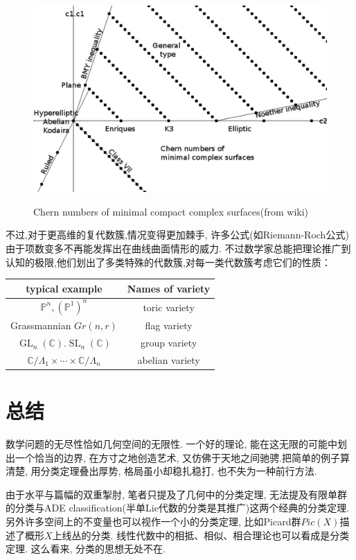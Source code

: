 \documentclass[UTF8,12pt,twoside]{article}
\theoremstyle{definition}
\newcommand{\CC}{\mathbb{C}}  %
\newcommand{\GL}{\operatorname{GL}}
\newcommand{\SL}{\operatorname{SL}}
\numberwithin{equation}{section}
\begin{document}
\begin{center}
	\begin{figure}[ht]
		\vspace{0cm}
		\centering
		\includegraphics[width=14cm]{9-7-fig/chernofsurfaces.png}
		\label{fig:chernnumber}
		\captionsetup{labelformat=empty}
		\caption{Chern numbers of minimal compact complex surfaces(from wiki)}
	\end{figure}
\end{center}

不过,对于更高维的复代数簇,情况变得更加棘手, 许多公式(如Riemann-Roch公式)由于项数变多不再能发挥出在曲线曲面情形的威力. 不过数学家总能把理论推广到认知的极限,他们划出了多类特殊的代数簇,对每一类代数簇考虑它们的性质：
\begin{center}
	\begin{tabular}{|c|c|}
		\hline
		typical example & Names of variety\\
		\hline
		$\mathbb{P}^n,(\mathbb{P}^1)^n$ & toric variety \\
		\hline
		Grassmannian $Gr(n,r)$ & flag variety\\
		\hline
		$\GL_n(\CC).\SL_n(\CC)$ & group variety\\
		\hline
		$\CC/\Lambda_1 \times\cdots\times \CC/\Lambda_n$ & abelian variety\\
		\hline
	\end{tabular}
\end{center}



\section{总结}


数学问题的无尽性恰如几何空间的无限性. 一个好的理论, 能在这无限的可能中划出一个恰当的边界, 在方寸之地创造艺术, 又仿佛于天地之间驰骋.把简单的例子算清楚, 用分类定理叠出厚势, 格局虽小却稳扎稳打, 也不失为一种前行方法.

由于水平与篇幅的双重掣肘, 笔者只提及了几何中的分类定理, 无法提及有限单群的分类与ADE classification(半单Lie代数的分类是其推广)这两个经典的分类定理. 另外许多空间上的不变量也可以视作一个小的分类定理, 比如Picard群$Pic(X)$描述了概形$X$上线丛的分类. 线性代数中的相抵、相似、相合理论也可以看成是分类定理. 这么看来, 分类的思想无处不在.

\end{document}
